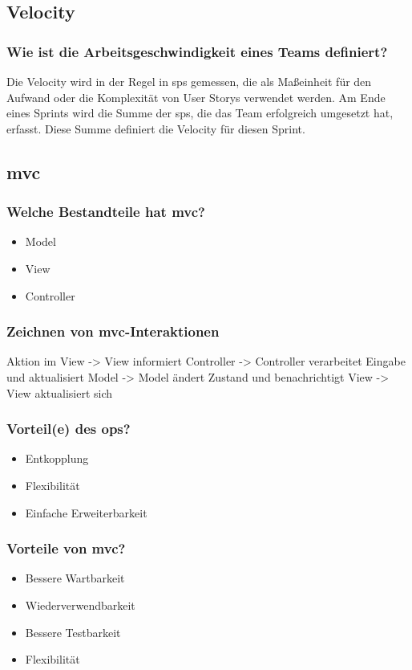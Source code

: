 \documentclass[main.tex]{subfiles}
\begin{document}
\subsection{\gls{Velocity}}
\subsubsection*{Wie ist die Arbeitsgeschwindigkeit eines Teams definiert?}
Die \gls{Velocity} wird in der Regel in \glspl{sp} gemessen, die als Maßeinheit für den Aufwand oder die Komplexität von \glspl{User Story} verwendet werden. Am Ende eines \glspl{Sprint} wird die Summe der \glspl{sp}, die das Team erfolgreich umgesetzt hat, erfasst. Diese Summe definiert die \gls{Velocity} für diesen \gls{Sprint}.

\subsection{\gls{mvc}}
\subsubsection*{Welche Bestandteile hat \gls{mvc}?}
\begin{itemize}
    \item Model
    \item View
    \item Controller
\end{itemize}
\subsubsection*{Zeichnen von \gls{mvc}-Interaktionen}
Aktion im View -> View informiert Controller -> Controller verarbeitet Eingabe und aktualisiert Model -> Model ändert Zustand und benachrichtigt View -> View aktualisiert sich 
\subsubsection*{Vorteil(e) des \gls{op}s?}
\begin{itemize}
    \item Entkopplung
    \item Flexibilität
    \item Einfache Erweiterbarkeit
\end{itemize}
\subsubsection*{Vorteile von \gls{mvc}?}
\begin{itemize}
    \item Bessere Wartbarkeit
    \item Wiederverwendbarkeit
    \item Bessere Testbarkeit
    \item Flexibilität
\end{itemize}
\end{document}
